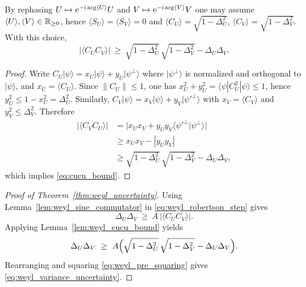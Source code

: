\begin{lemma}
\label{lem:weyl_cucu_bound}
By rephasing $U\mapsto \mathrm{e}^{-\mathrm{i}\arg\langle U\rangle}U$ and $V\mapsto \mathrm{e}^{-\mathrm{i}\arg\langle V\rangle}V$ one may assume $\langle U\rangle,\langle V\rangle\in\mathbb{R}_{\ge 0}$, hence $\langle S_U\rangle=\langle S_V\rangle=0$ and $\langle C_U\rangle=\sqrt{1-\Delta_U^2}$, $\langle C_V\rangle=\sqrt{1-\Delta_V^2}$.
With this choice,
\begin{equation}
\bigl|\langle C_UC_V\rangle\bigr|\ \ge\ \sqrt{1-\Delta_U^2}\,\sqrt{1-\Delta_V^2}-\Delta_U\Delta_V.
\label{eq:cucu_bound}
\end{equation}
\end{lemma}

\begin{proof}
Write
$C_U|\psi\rangle=x_U|\psi\rangle+y_U|\psi^{\perp}\rangle$
where $|\psi^{\perp}\rangle$ is normalized and orthogonal to $|\psi\rangle$, and $x_U=\langle C_U\rangle$.
Since $\|C_U\|\le 1$, one has $x_U^2+y_U^2=\langle\psi|C_U^2|\psi\rangle\le 1$, hence
$y_U^2\le 1-x_U^2=\Delta_U^2$.
Similarly,
$C_V|\psi\rangle=x_V|\psi\rangle+y_V|\psi'^{\perp}\rangle$
with $x_V=\langle C_V\rangle$ and $y_V^2\le \Delta_V^2$.
Therefore
\begin{align}
\bigl|\langle C_VC_U\rangle\bigr|
&=\bigl|x_Ux_V+y_Uy_V\langle\psi'^{\perp}|\psi^{\perp}\rangle\bigr|\\
&\ge x_Ux_V-|y_Uy_V|\\
&\ge \sqrt{1-\Delta_U^2}\,\sqrt{1-\Delta_V^2}-\Delta_U\Delta_V,
\end{align}
which implies \eqref{eq:cucu_bound}.
\end{proof}

\begin{proof}[Proof of Theorem~\ref{thm:weyl_uncertainty}]
Using Lemma~\ref{lem:weyl_sine_commutator} in \eqref{eq:weyl_robertson_step} gives
\begin{equation}
\Delta_U\Delta_V\ \ge\ A\,\bigl|\langle C_UC_V\rangle\bigr|.
\end{equation}
Applying Lemma~\ref{lem:weyl_cucu_bound} yields
\begin{equation}
\Delta_U\Delta_V\ \ge\ A\Bigl(\sqrt{1-\Delta_U^2}\,\sqrt{1-\Delta_V^2}-\Delta_U\Delta_V\Bigr).
\label{eq:weyl_pre_squaring}
\end{equation}
Rearranging and squaring \eqref{eq:weyl_pre_squaring} gives \eqref{eq:weyl_variance_uncertainty}.
\end{proof}

